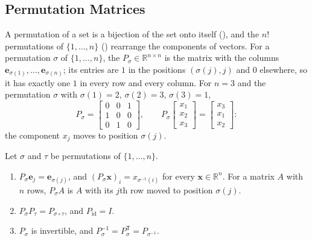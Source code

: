 \subsection{Permutation Matrices}

A permutation of a set is a bijection of the set onto itself (), and the $n!$ permutations of $\{1,\ldots,n\}$ () rearrange the components of vectors. For a permutation $\sigma$ of $\{1,\ldots,n\}$, the  $P_\sigma\in\mathbb R^{n\times n}$ is the matrix with the columns $\mathbf e_{\sigma(1)},\ldots,\mathbf e_{\sigma(n)}$; its entries are $1$ in the positions $(\sigma(j),j)$ and $0$ elsewhere, so it has exactly one $1$ in every row and every column. For $n=3$ and the permutation $\sigma$ with $\sigma(1)=2$, $\sigma(2)=3$, $\sigma(3)=1$,
\[
P_\sigma=\begin{bmatrix}0&0&1\\1&0&0\\0&1&0\end{bmatrix},\qquad P_\sigma\begin{bmatrix}x_1\\x_2\\x_3\end{bmatrix}=\begin{bmatrix}x_3\\x_1\\x_2\end{bmatrix}:
\]
the component $x_j$ moves to position $\sigma(j)$.

\begin{proposition}
\label{prop:permutation-matrices}
Let $\sigma$ and $\tau$ be permutations of $\{1,\ldots,n\}$.
\begin{enumerate}
\item $P_\sigma\mathbf e_j=\mathbf e_{\sigma(j)}$, and $(P_\sigma\mathbf x)_i=x_{\sigma^{-1}(i)}$ for every $\mathbf x\in\mathbb R^n$. For a matrix $A$ with $n$ rows, $P_\sigma A$ is $A$ with its $j$th row moved to position $\sigma(j)$.
\item $P_\sigma P_\tau=P_{\sigma\circ\tau}$, and $P_{\operatorname{id}}=I$.
\item $P_\sigma$ is invertible, and $P_\sigma^{-1}=P_\sigma^{\mathsf T}=P_{\sigma^{-1}}$.
\end{enumerate}
\end{proposition}

